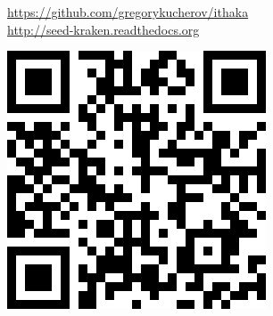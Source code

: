 \documentclass[portrait,final,a0paper,fontscale=0.277]{baposter}
\begin{document}
\begin{poster}
{ \vspace{-1.5em}
 
 \hspace{-2.0em}
  \begin{minipage}{\textwidth}
  \begin{minipage}{0.80\linewidth}
   {\smaller 
  \url{https://github.com/gregorykucherov/ithaka}\\
  \url{http://seed-kraken.readthedocs.org} 
   }
  \end{minipage}\hfill%
  \begin{minipage}{0.20\linewidth}
  \hfill\includegraphics[width=\linewidth]{images/qrcode-ithaka.png}
  \end{minipage}
  \end{minipage}
   \vspace{0.3em}
  }



\end{poster}
\end{document}
